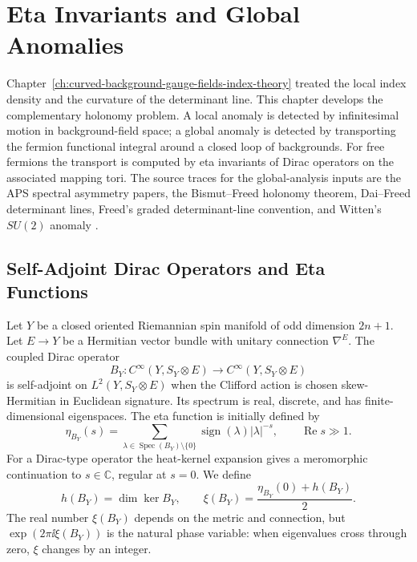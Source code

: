 \chapter{Eta Invariants and Global Anomalies}
\label{ch:curved-eta-invariants-global-anomalies}

\ConventionsEuclidean

Chapter~\ref{ch:curved-background-gauge-fields-index-theory} treated the
local index density and the curvature of the determinant line.  This chapter
develops the complementary holonomy problem.  A local anomaly is detected by
infinitesimal motion in background-field space; a global anomaly is detected
by transporting the fermion functional integral around a closed loop of
backgrounds.  For free fermions the transport is computed by eta invariants
of Dirac operators on the associated mapping tori.
The source traces for the global-analysis inputs are the APS spectral
asymmetry papers, the Bismut--Freed holonomy theorem, Dai--Freed determinant
lines, Freed's graded determinant-line convention, and Witten's \(SU(2)\)
anomaly
\cite{APS1975I,APS1975II,APS1976III,BismutFreed1986,DaiFreed1994,
Freed1995DeterminantRevisited,Witten1982}.

\section{Self-Adjoint Dirac Operators and Eta Functions}

Let \(Y\) be a closed oriented Riemannian spin manifold of odd dimension
\(2n+1\).  Let \(E\to Y\) be a Hermitian vector bundle with unitary connection
\(\nabla^E\).  The coupled Dirac operator
\[
  B_Y
  :
  C^\infty(Y,S_Y\otimes E)\longrightarrow
  C^\infty(Y,S_Y\otimes E)
\]
is self-adjoint on \(L^2(Y,S_Y\otimes E)\) when the Clifford action is chosen
skew-Hermitian in Euclidean signature.  Its spectrum is real, discrete, and
has finite-dimensional eigenspaces.  The eta function is initially defined by
\begin{equation}
  \eta_{B_Y}(s)
  =
  \sum_{\lambda\in\operatorname{Spec}(B_Y)\setminus\{0\}}
  \operatorname{sign}(\lambda)|\lambda|^{-s},
  \qquad
  \operatorname{Re}s\gg1 .
  \label{eq:eta-function-definition}
\end{equation}
For a Dirac-type operator the heat-kernel expansion gives a meromorphic
continuation to \(s\in\mathbb C\), regular at \(s=0\).  We define
\begin{equation}
  h(B_Y)=\dim\ker B_Y,
  \qquad
  \xi(B_Y)=\frac{\eta_{B_Y}(0)+h(B_Y)}2 .
  \label{eq:reduced-eta-invariant}
\end{equation}
The real number \(\xi(B_Y)\) depends on the metric and connection, but
\(\exp(2\pi\ii\xi(B_Y))\) is the natural phase variable: when eigenvalues
cross through zero, \(\xi\) changes by an integer.

